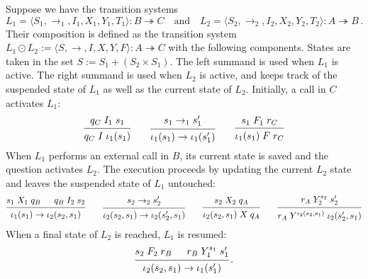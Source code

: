 \documentclass[acmsmall,screen,review,anonymous]{acmart}
\begin{document}

\begin{definition} \label{def:lcomp} %
Suppose we have the transition systems
\[
  L_1 = \langle S_1, {\rightarrow_1}, I_1, X_1, Y_1, T_1 \rangle
    : B \twoheadrightarrow C
  \quad \text{and} \quad
  L_2 = \langle S_2, {\rightarrow_2}, I_2, X_2, Y_2, T_2 \rangle
    : A \twoheadrightarrow B
  \,.
\]
Their composition is defined as the transition system
$
  L_1 \odot L_2 :=
  \langle S, {\rightarrow}, I, X, Y, F \rangle
  : A \twoheadrightarrow C
$
with the following components.
States are taken in the set
$
    S := S_1 + (S_2 \times S_1)
$.
The left summand is used when $L_1$ is active.
The right summand is used when $L_2$ is active,
and keeps track of the suspended state of $L_1$
as well as the current state of $L_2$.
Initially, a call in $C$ activates $L_1$:
\[
  \begin{prooftree}
    \hypo{q_C \mathrel{I_1} s_1}
    \infer1{q_C \mathrel{I} \iota_1(s_1)}
  \end{prooftree}
  \qquad
  \begin{prooftree}
    \hypo{s_1 \rightarrow_1 s_1'}
    \infer1{\iota_1(s_1) \rightarrow \iota_1(s_1')}
  \end{prooftree}
  \qquad
  \begin{prooftree}
    \hypo{s_1 \mathrel{F_1} r_C}
    \infer1{\iota_1(s_1) \mathrel{F} r_C}
  \end{prooftree}
\]
When $L_1$ performs an external call in $B$,
its current state is saved and
the question activates $L_2$.
The execution proceeds
by updating the current $L_2$ state
and leaves the suspended state of $L_1$ untouched:
\[
  \begin{prooftree}
    \hypo{s_1 \mathrel{X_1} q_B}
    \hypo{q_B \mathrel{I_2} s_2}
    \infer2{\iota_1(s_1) \rightarrow \iota_2(s_2, s_1)}
  \end{prooftree}
  \qquad
  \begin{prooftree}
    \hypo{s_2 \rightarrow_2 s_2'}
    \infer1{\iota_2(s_2, s_1) \rightarrow \iota_2(s_2', s_1)}
  \end{prooftree}
  \qquad
  \begin{prooftree}
    \hypo{s_2 \mathrel{X_2} q_A}
    \infer1{\iota_2(s_2, s_1) \mathrel{X} q_A}
  \end{prooftree}
  \qquad
  \begin{prooftree}
    \hypo{r_A \mathrel{Y_2^{s_2}} s_2'}
    \infer1{r_A \mathrel{Y^{\iota_2(s_2, s_1)}} \iota_2(s_2', s_1)}
  \end{prooftree}
\]
When a final state of $L_2$ is reached,
$L_1$ is resumed:
\[
  \begin{prooftree}
    \hypo{s_2 \mathrel{F_2} r_B}
    \hypo{r_B \mathrel{Y_1^{s_1}} s_1'}
    \infer2{\iota_2(s_2, s_1) \rightarrow \iota_1(s_1')}
  \end{prooftree}
  \,.
\]
\end{definition}
\end{document}
